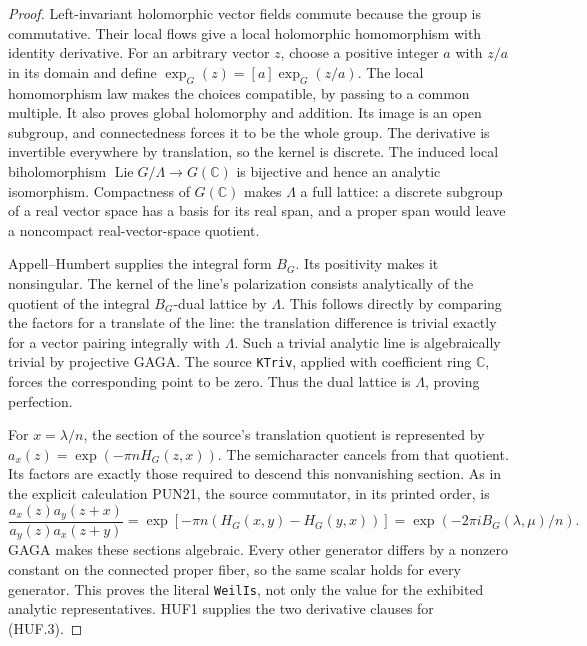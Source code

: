 \begin{proof}
Left-invariant holomorphic vector fields commute because the group
is commutative.  Their local flows give a local holomorphic
homomorphism with identity derivative.  For an arbitrary vector
\(z\), choose a positive integer \(a\) with \(z/a\) in its
domain and define \(\exp_G(z)=[a]\exp_G(z/a)\).
The local homomorphism law makes the choices compatible, by
passing to a common multiple.  It also proves global
holomorphy and addition.  Its image is an open subgroup,
and connectedness forces it to be the whole group.
The derivative is invertible everywhere by translation, so the
kernel is discrete.  The induced local biholomorphism
\(\operatorname{Lie}G/\Lambda\to G(\mathbb C)\) is bijective
and hence an analytic isomorphism.  Compactness of \(G(\mathbb C)\)
makes \(\Lambda\) a full lattice: a discrete subgroup of a real
vector space has a basis for its real span, and a proper span
would leave a noncompact real-vector-space quotient.

Appell--Humbert supplies the integral form \(B_G\).
Its positivity makes it nonsingular.  The kernel of the line's
polarization consists analytically of the quotient of the
integral \(B_G\)-dual lattice by \(\Lambda\).  This follows
directly by comparing the factors for a translate of the line:
the translation difference is trivial exactly for a vector
pairing integrally with \(\Lambda\).  Such a trivial analytic
line is algebraically trivial by projective GAGA.
The source \texttt{KTriv}, applied with coefficient ring
\(\mathbb C\), forces the corresponding point to be zero.
Thus the dual lattice is \(\Lambda\), proving perfection.

For \(x=\lambda/n\), the section of the source's translation
quotient is represented by
\(a_x(z)=\exp(-\pi nH_G(z,x))\).
The semicharacter cancels from that quotient.  Its factors
are exactly those required to descend this nonvanishing
section.  As in the explicit calculation PUN21, the source
commutator, in its printed order, is
\[
 \frac{a_x(z)a_y(z+x)}{a_y(z)a_x(z+y)}
   =\exp[-\pi n(H_G(x,y)-H_G(y,x))]
   =\exp(-2\pi iB_G(\lambda,\mu)/n).
\]
GAGA makes these sections algebraic.  Every other generator
differs by a nonzero constant on the connected proper fiber,
so the same scalar holds for every generator.  This proves
the literal \texttt{WeilIs}, not only the value for the
exhibited analytic representatives.  HUF1 supplies the two
derivative clauses for (HUF.3).
\end{proof}

